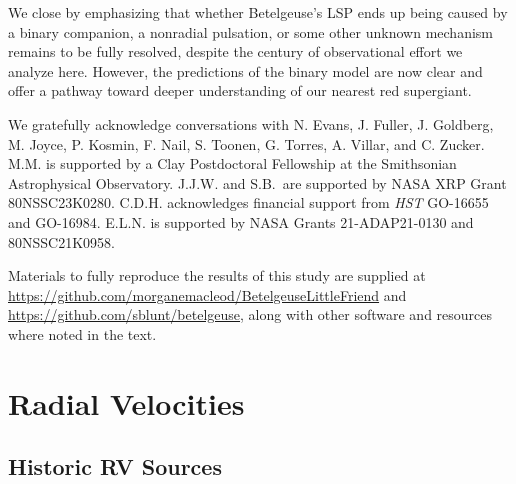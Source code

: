 \documentclass[twocolumn]{aastex631}
\begin{document}
We close by emphasizing that whether Betelgeuse's LSP ends up being caused by a binary companion, a nonradial pulsation, or some other unknown mechanism remains to be fully resolved, despite the century of observational effort we analyze here. However, the predictions of the binary model are now clear and offer a pathway toward deeper understanding of our nearest red supergiant. 

\vspace{0.5cm}
     We gratefully acknowledge conversations with N. Evans, J. Fuller, J. Goldberg, M. Joyce, P. Kosmin, F. Nail, S. Toonen, G. Torres, A. Villar, and C. Zucker. 
    M.M. is supported by a Clay Postdoctoral Fellowship at the Smithsonian Astrophysical Observatory. 
    J.J.W. and S.B.\ are supported by NASA XRP Grant 80NSSC23K0280. C.D.H. acknowledges financial support from \textit{HST} GO-16655 and GO-16984. 
    E.L.N. is supported by NASA Grants 21-ADAP21-0130 and 80NSSC21K0958.


    Materials to fully reproduce the results of this study are supplied at \url{https://github.com/morganemacleod/BetelgeuseLittleFriend} and \url{https://github.com/sblunt/betelgeuse}, along with other software and resources where noted in the text.  


\clearpage
\appendix
\section{Radial Velocities}

\subsection{Historic RV Sources}\label{sec:RVsources}
\end{document}

